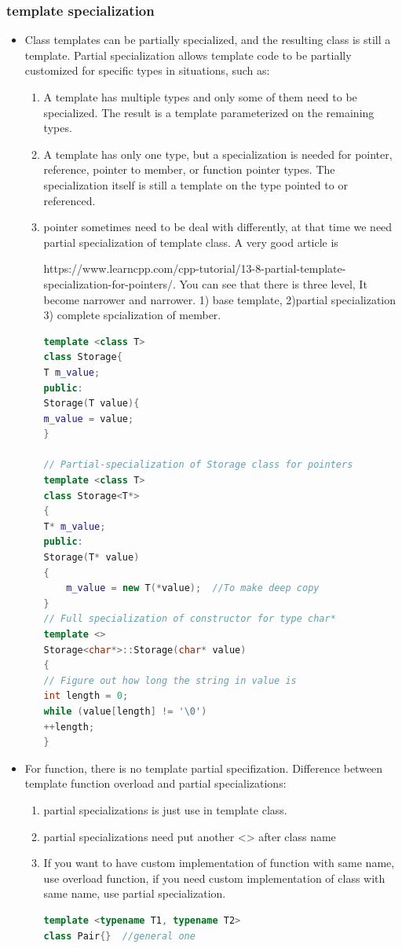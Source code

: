 \documentclass[a4paper,12pt,twoside]{book}
\begin{document}
\subsubsection{template specialization}
\begin{itemize}
\item Class templates can be partially specialized, and the resulting class is still a template. Partial specialization allows template code to be partially customized for specific types in situations, such as:

\begin{enumerate}
\item A template has multiple types and only some of them need to be specialized. The result is a template parameterized on the remaining types.

\item A template has only one type, but a specialization is needed for pointer, reference, pointer to member, or function pointer types. The specialization itself is still a template on the type pointed to or referenced.

\item pointer sometimes need to be deal with differently, at that time we need partial specialization of template class. A very good article is

https://www.learncpp.com/cpp-tutorial/13-8-partial-template-specialization-for-pointers/. 
You can see that there is three level, It become narrower and narrower. 1) base template, 2)partial specialization 3) complete spcialization of member.
\begin{lstlisting}[frame=single, language=c++]
template <class T>
class Storage{
T m_value;
public:
Storage(T value){
m_value = value;
}

// Partial-specialization of Storage class for pointers
template <class T>
class Storage<T*>
{
T* m_value;
public:
Storage(T* value)
{
	m_value = new T(*value);  //To make deep copy
}
// Full specialization of constructor for type char*
template <>
Storage<char*>::Storage(char* value)
{
// Figure out how long the string in value is
int length = 0;
while (value[length] != '\0')
++length;
}
\end{lstlisting}

\end{enumerate}

\item For function, there is no template partial specifization. Difference between template function overload and partial specializations:
\begin{enumerate}
\item partial specializations is just use in template class.
\item partial specializations need put another <> after class name
\item If you want to have custom implementation of function with same name, use overload function, if you need  custom implementation of class with same name, use partial specialization.
\begin{lstlisting}[frame=single, language=c++]
template <typename T1, typename T2>
class Pair{}  //general one


\end{lstlisting}
\end{enumerate}
\end{itemize}
\end{document}
